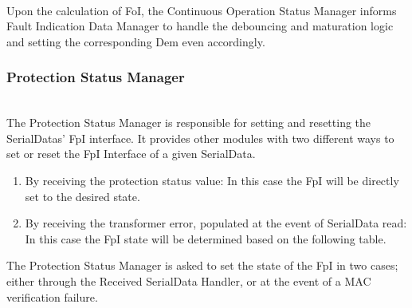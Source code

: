 { }


\\

Upon the calculation of FoI, the Continuous Operation Status Manager informs Fault Indication Data Manager 
to handle the debouncing and maturation logic and setting the corresponding Dem even accordingly.

{     }


\subsubsection{Protection Status Manager}
\\
\label{sec:ProtectionStatusDynamic}
The Protection Status Manager is responsible for setting and resetting the SerialDatas' FpI interface. It provides other modules with two different ways to set or reset the FpI Interface of a given SerialData.
\begin{enumerate}
    \item By receiving the protection status value: In this case the FpI will be directly set to the desired state.
    \item By receiving the transformer error, populated at the event of SerialData read: In this case the FpI state will be determined based on the following table.
\end{enumerate}
The Protection Status Manager is asked to set the state of the FpI in two cases; either through the Received SerialData Handler, or at the event of a MAC verification failure. 

